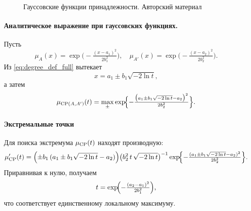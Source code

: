 \begin{figure}[h]
  \centering
  \caption{Гауссовские функции принадлежности. Авторский материал}
\end{figure}

\paragraph{Аналитическое выражение при гауссовских функциях.}  
Пусть
\[
\mu_A(x)=\exp\!\bigl(-\tfrac{(x-a_1)^2}{2b_1^2}\bigr),\quad
\mu_{A'}(x)=\exp\!\bigl(-\tfrac{(x-a_2)^2}{2b_2^2}\bigr).
\]
Из \eqref{eq:degree_def_full} вытекает
\[
x = a_1 \pm b_1\sqrt{-2\ln t},
\]
а затем
\begin{equation}\label{eq:degree_gauss_full}
\mu_{\operatorname{CP}(A,A')}(t)
=
\max_{\pm}
\exp\!\Bigl\{-\tfrac{\bigl(a_1\pm b_1\sqrt{-2\ln t}-a_2\bigr)^2}{2b_2^2}\Bigr\}.
\end{equation}

\paragraph{Экстремальные точки}  
Для поиска экстремума $\mu_{\operatorname{CP}}(t)$ находят производную:
\[
\mu'_{\operatorname{CP}}(t)
=
\Bigl(\pm b_1\,(a_1\pm b_1\sqrt{-2\ln t}-a_2)\Bigr)
\bigl(b_2^2\,t\,\sqrt{-2\ln t}\bigr)^{-1}
\exp\!\Bigl\{-\tfrac{(a_1\pm b_1\sqrt{-2\ln t}-a_2)^2}{2b_2^2}\Bigr\}.
\]
Приравнивая к нулю, получаем
\[
t = \exp\!\Bigl(-\tfrac{(a_2-a_1)^2}{2b_1^2}\Bigr),
\]
что соответствует единственному локальному максимуму.


